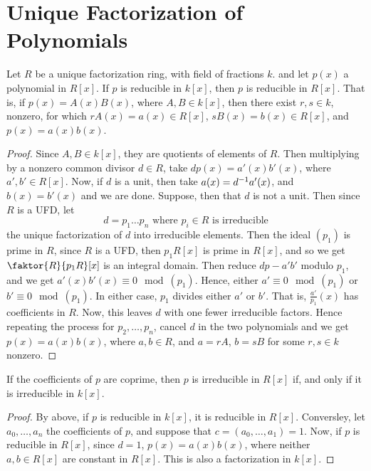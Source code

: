 \section{Unique Factorization of Polynomials}
\label{section_7.2}

\begin{proposition}[Gauss]\label{proposition_7.2.1}
  Let $R$ be a unique factorization ring, with field of fractions $k$. and let
  $p(x)$ a polynomial in $R[x]$. If $p$ is reducible in $k[x]$, then $p$ is
  reducible in  $R[x]$. That is, if $p(x)=A(x)B(x)$, where $A,B \in k[x]$,
  then there exist $r,s \in k$, nonzero, for which  $rA(x)=a(x) \in R[x]$,
  $sB(x)=b(x) \in R[x]$, and $p(x)=a(x)b(x)$.
\end{proposition}
\begin{proof}
  Since $A,B \in k[x]$, they are quotients of elements of $R$. Then
  multiplying by a nonzero common divisor  $d \in R$, take  $dp(x)=a'(x)b'(x)$,
  where $a',b' \in R[x]$. Now, if $d$ is a unit, then take
  $a(x)=d^{-1}a'(x)$, and $b(x)=b'(x)$ and we are done. Suppose, then that
  $d$ is not a unit. Then since  $R$ is a UFD, let
  \begin{equation*}
    d=p_1 \dots p_n \text{ where } p_i \in R \text{ is irreducible}
  \end{equation*}
  the unique factorization of $d$ into irreducible elements. Then the ideal
  $(p_1)$ is prime in $R$, since  $R$ is a UFD, then  $p_1R[x]$ is prime in
  $R[x]$, and so we get $\faktor{R}{p_1R}[x]$ is an integral domain. Then
  reduce $dp-a'b'$ modulo  $p_1$, and we get $a'(x)b'(x) \equiv 0
  \mod{(p_1)}$. Hence, either $a' \equiv 0 \mod{(p_1)}$ or $b' \equiv 0
  \mod{(p_1)}$. In either case, $p_1$ divides either $a'$ or  $b'$. That is,
  $\frac{a'}{p_1}(x)$ has coefficients in $R$. Now, this leaves  $d$ with one
  fewer irreducible factors. Hence repeating the process for  $p_2, \dots,
  p_n$, cancel $d$ in the two polynomials and we get  $p(x)=a(x)b(x)$, where
  $a,b \in R$, and  $a=rA$,  $b=sB$ for some  $r,s \in k$ nonzero.
\end{proof}
\begin{corollary}
  If the coefficients of $p$ are coprime, then  $p$ is irreducible in  $R[x]$
  if, and only if it is irreducible in $k[x]$.
\end{corollary}
\begin{proof}
  By above, if $p$ is reducible in $k[x]$, it is reducible in $R[x]$.
  Conversley, let $a_0, \dots, a_n$ the coefficients of $p$, and suppose that
  $c=(a_0, \dots, a_1)=1$. Now, if $p$ is reducible in $R[x]$, since $d=1$,
  $p(x)=a(x)b(x)$, where neither $a,b \in R[x]$ are constant in $R[x]$. This
  is also a factorization in $k[x]$.
\end{proof}

